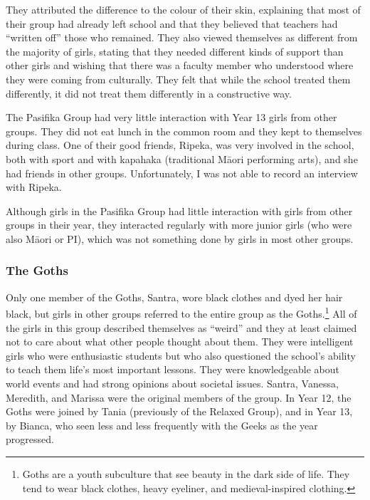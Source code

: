 \vspace{5 mm}

\noindent They attributed the difference to the colour of their skin, explaining that most of their group had already left school and that they believed that teachers had ``written off'' those who remained.  They also viewed themselves as different from the majority of girls, stating that they needed different kinds of support than other girls and wishing that there was a faculty member who understood where they were coming from culturally.  They felt that while the school treated them differently, it did not treat them differently in a constructive way.



The Pasifika Group had very little interaction with Year 13 girls from other groups.  They did not eat lunch in the common room and they kept to themselves during class.  One of their good friends, Ripeka, was very involved in the school, both with sport and with kapahaka (traditional M\=aori performing arts), and she had friends in other groups.  Unfortunately, I was not able to record an interview with Ripeka.

Although girls in the Pasifika Group had little interaction with girls from other groups in their year, they interacted regularly with more junior girls (who were also M\=aori or PI), which was not something done by girls in most other groups.  

\subsubsection{The Goths}

Only one member of the Goths, Santra, wore black clothes and dyed her hair black, but girls in other groups referred to the entire group as the Goths.\footnote{Goths are a youth subculture that see beauty in the dark side of life.  They tend to wear black clothes, heavy eyeliner, and medieval-inspired clothing.}  All of the girls in this group described themselves as ``weird'' and they at least claimed not to care about what other people thought about them.  They were intelligent girls who were enthusiastic students but who also questioned the school's ability to teach them life's most important lessons.  They were knowledgeable about world events and had strong opinions about societal issues.  Santra, Vanessa, Meredith, and Marissa were the original members of the group.  In Year 12, the Goths were joined by Tania (previously of the Relaxed Group), and in Year 13, by Bianca, who seen less and less frequently with the Geeks as the year progressed.

